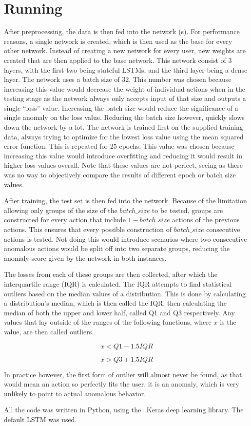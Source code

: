 \section{Running}
After preprocessing, the data is then fed into the network (s). For performance reasons, a single network is created, which is then used as the base for every other network. Instead of creating a new network for every user, new weights are created that are then applied to the base network. This network consist of 3 layers, with the first two being stateful LSTMs, and the third layer being a dense layer. The network uses a batch size of 32. This number was chosen because increasing this value would decrease the weight of individual actions when in the testing stage as the network always only accepts input of that size and outputs a single \enquote{loss} value. Increasing the batch size would reduce the significance of a single anomaly on the loss value. Reducing the batch size however, quickly slows down the network by a lot. The network is trained first on the supplied training data, always trying to optimize for the lowest loss value using the mean squared error function. This is repeated for 25 epochs. This value was chosen because increasing this value would introduce overfitting and reducing it would result in higher loss values overall. Note that these values are not perfect, seeing as there was no way to objectively compare the results of different epoch or batch size values. 

After training, the test set is then fed into the network. Because of the limitation allowing only groups of the size of the $batch\_size$ to be tested, groups are constructed for every action that include $1 - batch\_size$ actions of the previous actions. This ensures that every possible construction of $batch\_size$ consecutive actions is tested. Not doing this would introduce scenarios where two consecutive anomalous actions would be split off into two separate groups, reducing the anomaly score given by the network in both instances.

The losses from each of these groups are then collected, after which the interquartile range (IQR) is calculated. The IQR attempts to find statistical outliers based on the median values of a distribution. This is done by calculating a distribution's median, which is then called the IQR, then calculating the median of both the upper and lower half, called Q1 and Q3 respectively. Any values that lay outside of the ranges of the following functions, where $x$ is the value, are then called outliers.

$$ x < Q1 - 1.5IQR $$

$$ x > Q3 + 1.5IQR $$

In practice however, the first form of outlier will almost never be found, as that would mean an action so perfectly fits the user, it is an anomaly, which is very unlikely to point to actual anomalous behavior.

All the code was written in Python, using the~\cite{chollet2015keras} Keras deep learning library. The default LSTM was used.